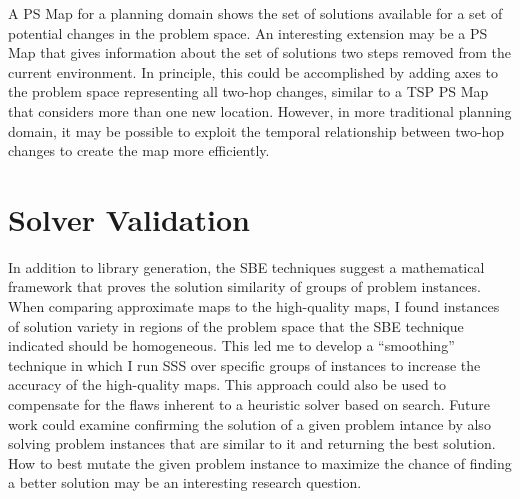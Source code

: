 A PS Map for a planning domain shows the set of solutions available for a set of potential changes in the problem space.  An interesting extension may be a PS Map that gives information about the set of solutions two steps removed from the current environment.  In principle, this could be accomplished by adding axes to the problem space representing all two-hop changes, similar to a TSP PS Map that considers more  than one new location. However, in more traditional planning domain, it may be possible to exploit the temporal relationship between two-hop changes to create the map more efficiently.





\section{Solver Validation}
In addition to library generation, the SBE techniques suggest a mathematical framework that proves the solution similarity of groups of problem instances.   When comparing approximate maps to the high-quality maps, I found instances of solution variety in regions of the problem space that the SBE technique indicated should be homogeneous.  This led me to develop a ``smoothing'' technique in which I run SSS over specific groups of instances to increase the accuracy of the high-quality maps.   This approach could also be used to compensate for the flaws inherent to a heuristic solver based on search.  Future work could examine confirming the solution of a given problem intance by also solving problem instances that are similar to it and returning the best solution.  How to best mutate the given problem instance to maximize the chance of finding a better solution may be an interesting research question.


